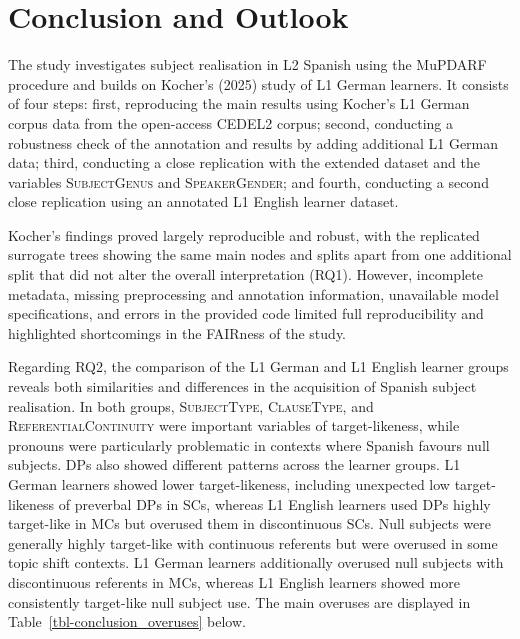 \documentclass[
  letterpaper,
  DIV=11,
  numbers=noendperiod]{scrartcl}
\begin{document}
\section{Conclusion and Outlook}\label{sec-Conclusion}

The study investigates subject realisation in L2 Spanish using the
MuPDARF procedure and builds on Kocher's (2025) study of L1 German
learners. It consists of four steps: first, reproducing the main results
using Kocher's L1 German corpus data from the open-access CEDEL2 corpus;
second, conducting a robustness check of the annotation and results by
adding additional L1 German data; third, conducting a close replication
with the extended dataset and the variables \textsc{SubjectGenus} and
\textsc{SpeakerGender}; and fourth, conducting a second close
replication using an annotated L1 English learner dataset.

Kocher's findings proved largely reproducible and robust, with the
replicated surrogate trees showing the same main nodes and splits apart
from one additional split that did not alter the overall interpretation
(RQ1). However, incomplete metadata, missing preprocessing and
annotation information, unavailable model specifications, and errors in
the provided code limited full reproducibility and highlighted
shortcomings in the FAIRness of the study.

Regarding RQ2, the comparison of the L1 German and L1 English learner
groups reveals both similarities and differences in the acquisition of
Spanish subject realisation. In both groups, \textsc{SubjectType,
ClauseType,} and \textsc{ReferentialContinuity} were important variables
of target-likeness, while pronouns were particularly problematic in
contexts where Spanish favours null subjects. DPs also showed different
patterns across the learner groups. L1 German learners showed lower
target-likeness, including unexpected low target-likeness of preverbal
DPs in SCs, whereas L1 English learners used DPs highly target-like in
MCs but overused them in discontinuous SCs. Null subjects were generally
highly target-like with continuous referents but were overused in some
topic shift contexts. L1 German learners additionally overused null
subjects with discontinuous referents in MCs, whereas L1 English
learners showed more consistently target-like null subject use. The main
overuses are displayed in Table~\ref{tbl-conclusion_overuses} below.
\end{document}
